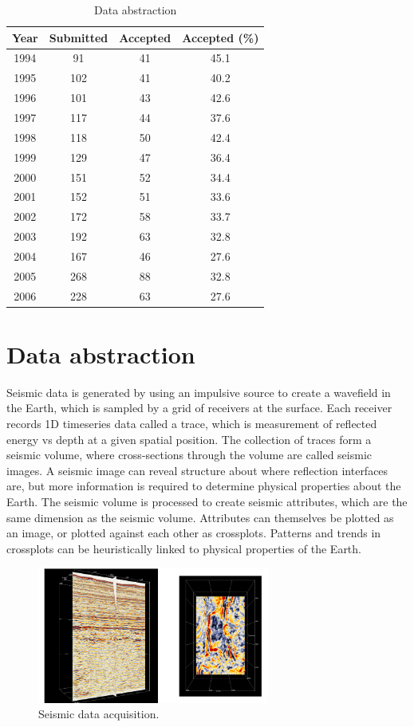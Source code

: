 \documentclass[journal]{vgtc}                %
\begin{document}
\begin{table}
 \caption{Data abstraction}
 \label{data_abstract}
 \scriptsize
 \begin{center}
   \begin{tabular}{cccc}
     Year & Submitted & Accepted & Accepted (\%)\\
   \hline
     1994 &  91 & 41 & 45.1\\
     1995 & 102 & 41 & 40.2\\
     1996 & 101 & 43 & 42.6\\
     1997 & 117 & 44 & 37.6\\
     1998 & 118 & 50 & 42.4\\
     1999 & 129 & 47 & 36.4\\
     2000 & 151 & 52 & 34.4\\
     2001 & 152 & 51 & 33.6\\
     2002 & 172 & 58 & 33.7\\
     2003 & 192 & 63 & 32.8\\
     2004 & 167 & 46 & 27.6\\
     2005 & 268 & 88 & 32.8\\
     2006 & 228 & 63 & 27.6
   \end{tabular}
 \end{center}
\end{table}


\section{Data abstraction}

Seismic data is generated by using an impulsive source to create a wavefield in the Earth,
which is sampled by a grid of receivers at the surface. Each receiver records 1D timeseries data called a trace,
which is measurement of reflected energy vs depth at a given spatial position. The collection of traces
form a seismic volume, where cross-sections through the volume are called seismic images. A seismic
image can reveal structure about where reflection interfaces are, but more information is required
to determine physical properties about the Earth. The seismic volume is processed to create seismic
attributes, which are the same dimension as the seismic volume. Attributes
can themselves be plotted as an image, or plotted against each other as crossplots. Patterns
and trends in crossplots can be heuristically linked to physical properties of the Earth.

\begin{figure}[htb]
\centering
\includegraphics[width=3in]{seismic_slices}
\caption{Seismic data acquisition.}
\label{seismic_acq}
\end{figure}
\end{document}
